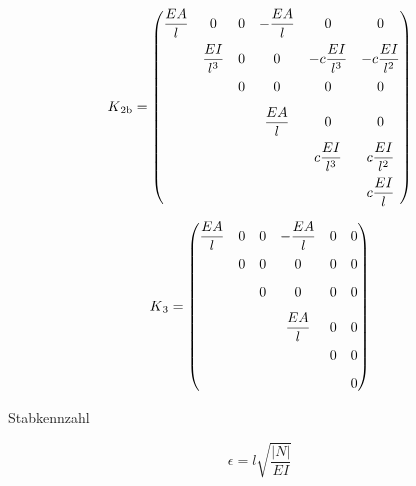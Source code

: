 \begin{equation} \label{K2b}
K\textsubscript{2b} = \begin{pmatrix}
\dfrac{EA}{l} & 0                   & 0                   & -\dfrac{EA}{l}  & 0                   & 0                   \\[0.8em]
              & \dfrac{EI}{l^3}     & 0                   & 0               & -c\dfrac{EI}{l^3}   & -c\dfrac{EI}{l^2}   \\[0.8em]
              &                     & 0                   & 0               & 0                   & 0                   \\[0.8em]
              &                     &                     & \dfrac{EA}{l}   & 0                   & 0                   \\[0.8em]
              &                     &                     &                 & c\dfrac{EI}{l^3}    & c\dfrac{EI}{l^2}    \\[0.8em]
              &                     &                     &                 &                     & c\dfrac{EI}{l}
     \end{pmatrix}
\end{equation}

\begin{equation} \label{K3}
K\textsubscript{3} = \begin{pmatrix}
\dfrac{EA}{l} & 0                   & 0                   & -\dfrac{EA}{l}  & 0                   & 0                   \\[0.8em]
              & 0                   & 0                   & 0               & 0                   & 0                   \\[0.8em]
              &                     & 0                   & 0               & 0                   & 0                   \\[0.8em]
              &                     &                     & \dfrac{EA}{l}   & 0                   & 0                   \\[0.8em]
              &                     &                     &                 & 0                   & 0                   \\[0.8em]
              &                     &                     &                 &                     & 0
     \end{pmatrix}
\end{equation}

Stabkennzahl 

\begin{equation} \label{e}
\epsilon = l\sqrt{\frac{|N|}{EI}}
\end{equation}

